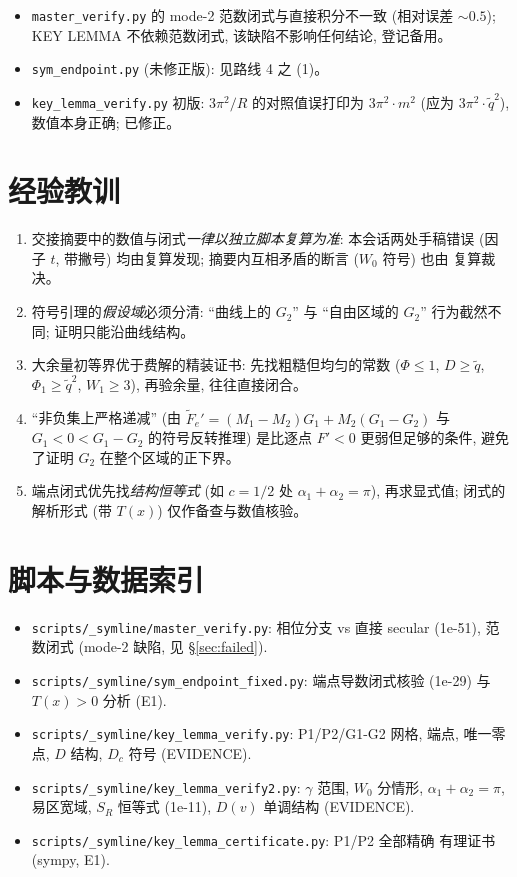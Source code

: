 \documentclass[UTF8]{ctexart}
\begin{document}
\begin{itemize}
	\item \texttt{master\_verify.py} 的 mode-2 范数闭式与直接积分不一致 (相对误差
		$\sim0.5$); KEY LEMMA 不依赖范数闭式, 该缺陷不影响任何结论, 登记备用。
	\item \texttt{sym\_endpoint.py} (未修正版): 见路线 4 之 (1)。
	\item \texttt{key\_lemma\_verify.py} 初版: $3\pi^2/R$ 的对照值误打印为
		$3\pi^2\cdot m^2$ (应为 $3\pi^2\cdot\tilde q^2$), 数值本身正确; 已修正。
\end{itemize}

\section{经验教训}

\begin{enumerate}
	\item 交接摘要中的数值与闭式\emph{一律以独立脚本复算为准}: 本会话两处手稿错误
		(因子 $t$, 带撇号) 均由复算发现; 摘要内互相矛盾的断言 ($W_0$ 符号) 也由
		复算裁决。
	\item 符号引理的\emph{假设域}必须分清: ``曲线上的 $G_2$'' 与 ``自由区域的
		$G_2$'' 行为截然不同; 证明只能沿曲线结构。
	\item 大余量初等界优于费解的精装证书: 先找粗糙但均匀的常数 ($\Phi\le1$,
		$D\ge\tilde q$, $\Phi_1\ge\tilde q^2$, $W_1\ge3$), 再验余量, 往往直接闭合。
	\item ``非负集上严格递减'' (由 $\widetilde F_e'=(M_1-M_2)G_1+M_2(G_1-G_2)$
		与 $G_1<0<G_1-G_2$ 的符号反转推理) 是比逐点 $F'<0$ 更弱但足够的条件,
		避免了证明 $G_2$ 在整个区域的正下界。
	\item 端点闭式优先找\emph{结构恒等式} (如 $c=1/2$ 处 $\alpha_1+\alpha_2=\pi$),
		再求显式值; 闭式的解析形式 (带 $T(x)$) 仅作备查与数值核验。
\end{enumerate}

\section{脚本与数据索引}

\begin{itemize}
	\item \texttt{scripts/\_symline/master\_verify.py}: 相位分支 vs 直接 secular
		(1e-51), 范数闭式 (mode-2 缺陷, 见 \S\ref{sec:failed}).
	\item \texttt{scripts/\_symline/sym\_endpoint\_fixed.py}: 端点导数闭式核验
		(1e-29) 与 $T(x)>0$ 分析 (E1).
	\item \texttt{scripts/\_symline/key\_lemma\_verify.py}: P1/P2/G1-G2 网格,
		端点, 唯一零点, $D$ 结构, $D_c$ 符号 (EVIDENCE).
	\item \texttt{scripts/\_symline/key\_lemma\_verify2.py}: $\gamma$ 范围, $W_0$
		分情形, $\alpha_1+\alpha_2=\pi$, 易区宽域, $S_R$ 恒等式 (1e-11), $D(v)$
		单调结构 (EVIDENCE).
	\item \texttt{scripts/\_symline/key\_lemma\_certificate.py}: P1/P2 全部精确
		有理证书 (sympy, E1).
\end{itemize}
\end{document}
